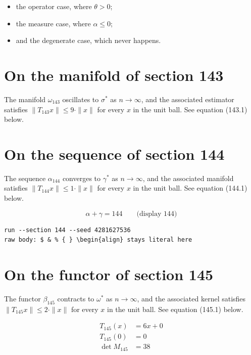 \documentclass{article}
\begin{document}
\begin{itemize}
  \item the operator case, where $\theta > 0$;
  \item the measure case, where $\alpha \leq 0$;
  \item and the degenerate case, which never happens.
\end{itemize}

\section{On the manifold of section 143}
The manifold $\omega_{143}$ oscillates to $\sigma^{*}$ as $n \to \infty$,
and the associated estimator satisfies $\|T_{143} x\| \leq 9 \cdot \|x\|$
for every $x$ in the unit ball. See equation (143.1) below.

\section{On the sequence of section 144}
The sequence $\alpha_{144}$ converges to $\gamma^{*}$ as $n \to \infty$,
and the associated manifold satisfies $\|T_{144} x\| \leq 1 \cdot \|x\|$
for every $x$ in the unit ball. See equation (144.1) below.

$$
\alpha + \gamma = 144 \qquad \text{(display 144)}
$$

\begin{verbatim}
run --section 144 --seed 4281627536
raw body: $ & % { } \begin{align} stays literal here
\end{verbatim}

\section{On the functor of section 145}
The functor $\beta_{145}$ contracts to $\omega^{*}$ as $n \to \infty$,
and the associated kernel satisfies $\|T_{145} x\| \leq 2 \cdot \|x\|$
for every $x$ in the unit ball. See equation (145.1) below.

\begin{align}
T_{145}(x) &= 6 x + 0 \\
T_{145}(0) &= 0 \\
\det M_{145} &= 38
\end{align}
\end{document}
